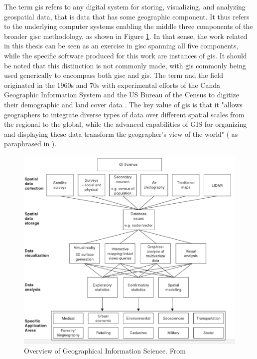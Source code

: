 The term \ac{gis} refers to any digital system for storing, visualizing, and analyzing geospatial data, that is data that has some geographic component. It thus refers to the underlying computer systems enabling the middle three components of the broader \ac{gisc} methodology, as shown in Figure \ref{fig:giscience}. In that sense, the work related in this thesis can be seen as an exercise in \ac{gisc} spanning all five components, while the specific software produced for this work are instances of \ac{gis}. It should be noted that this distinction is not commonly made, with \ac{gis} commonly being used generically to encompass both \ac{gisc} and \ac{gis}. The term and the field originated in the 1960s and 70s with experimental efforts of the Canda Geographic Information System and the US Bureau of the Census to digitize their demographic and land cover data \cite{goodchildGeographicInformationSystems1994}. The key value of \ac{gis} is that it "allows geographers to integrate diverse types of data over different spatial scales from the regional to the global, while the advanced capabilities of GIS for organizing and displaying these data transform the geographer's view of the world" (\cite{tomlinsonPRESIDENTIALADDRESSGEOGRAPHIC1989} as paraphrased in \cite{vereginComputerInnovationAdoption1994}).

\begin{figure}[h]
	\centering
	\includegraphics[scale=0.4]{Figures/chap2/GIScience.png}
	\caption[Overview of Geographical Information Science]{Overview of Geographical Information Science. From \cite{fotheringhamGeographicInformationScience2007}}
	\label{fig:giscience}
\end{figure}


